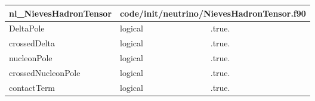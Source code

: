 \documentclass{article}
\begin{document}
{ }




\begin{longtable}{llll}
\toprule
\textbf{\large{nl\_NievesHadronTensor}} & \multicolumn{3}{l}{\footnotesize{code/init/neutrino/NievesHadronTensor.f90}}\\*
\midrule
\endfirsthead
\midrule
\endhead
DeltaPole & \begin{minipage}[t]{2cm}logical\end{minipage} & \begin{minipage}[t]{2cm}.true.\end{minipage} & \begin{minipage}[t]{12cm}\end{minipage}\\*
\midrule
crossedDelta & \begin{minipage}[t]{2cm}logical\end{minipage} & \begin{minipage}[t]{2cm}.true.\end{minipage} & \begin{minipage}[t]{12cm}\end{minipage}\\*
\midrule
nucleonPole & \begin{minipage}[t]{2cm}logical\end{minipage} & \begin{minipage}[t]{2cm}.true.\end{minipage} & \begin{minipage}[t]{12cm}\end{minipage}\\*
\midrule
crossedNucleonPole & \begin{minipage}[t]{2cm}logical\end{minipage} & \begin{minipage}[t]{2cm}.true.\end{minipage} & \begin{minipage}[t]{12cm}\end{minipage}\\*
\midrule
contactTerm & \begin{minipage}[t]{2cm}logical\end{minipage} & \begin{minipage}[t]{2cm}.true.\end{minipage} & \begin{minipage}[t]{12cm}\end{minipage}\\*

\end{longtable}
\end{document}
